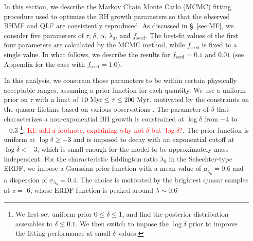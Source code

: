 \documentclass[twocolumn, twocolappendix]{aastex63}
\newcommand{\tlife}{\tau}
\newcommand{\fseed}{f_\mathrm{seed}}
\newcommand{\red}[1]{\textcolor{red}{ #1}}
\begin{document}
\begin{CJK*}{UTF8}{gbsn}
In this section, we describe the Markov Chain Monte Carlo (MCMC) fitting procedure used to optimize 
the BH growth parameters so that the observed BHMF and QLF are consistently reproduced. 
As discussed in \S~\ref{sec:MF}, we consider five parameters of $\tlife$, $\delta$, $\alpha$, $\lambda_0$, and $\fseed$.
The best-fit values of the first four parameters are calculated by the MCMC method, while $\fseed$ is fixed to a single value.
In what follows, we describe the results for $\fseed = 0.1$ and $0.01$ (see Appendix for the case with $\fseed =1.0$).


In this analysis, we constrain those parameters to be within certain physically acceptable ranges, 
assuming a prior function for each quantity.
We use a uniform prior on $\tlife$ with a limit of $10~{\rm Myr} \leq \tlife \leq 200~{\rm Myr}$,
motivated by the constraints on the quasar lifetime based on various observations
\citep[e.g.,][]{2004cbhg.symp..169M}.
The parameter of $\delta$ that characterizes a non-exponential BH growth 
is constrained at $\log \delta$ from $-4$ to $-0.3$ 
\footnote[2]{ We first set uniform prior $0\leq \delta \leq 1$, 
and find the posterior distribution assembles to $\delta \lesssim 0.1$.
We then switch to impose the $\log \delta$ prior to improve the fitting performance at small $\delta$ values.
}, 
\red{KI: add a footnote, explaining why not $\delta$ but $\log \delta$?}.
The prior function is uniform at $\log \delta \geq -3$ and is imposed to decay with an exponential cutoff at $\log \delta < -3$,
which is small enough for the model to be approximately mass independent.
For the characteristic Eddington ratio $\lambda_0$ in the Schechter-type ERDF, 
we impose a Gaussian prior function with a mean value of $\mu_{\lambda_0}=0.6$ and a dispersion of $\sigma_{\lambda_0}=0.4$.
The choice is motivated by the brightest quasar samples at $z=$ 6, whose ERDF function is peaked around $\lambda \sim 0.6$ 

\end{CJK*}
\end{document}
